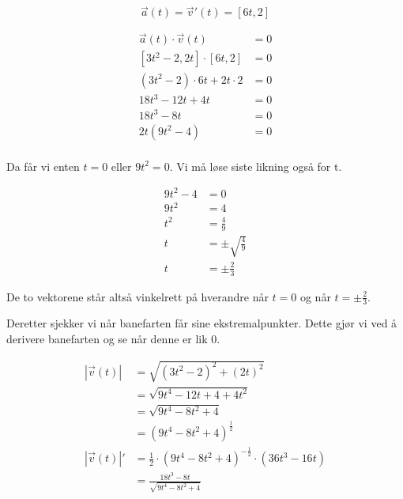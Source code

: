 \begin{easylist}[enumerate]
		$$\vec{a}(t)  = \vec{v}'(t)  = [6t,2] $$
		
		\begin{equation*}
			\begin{aligned}
				\vec{a}(t) \cdot \vec{v}(t) &= 0 \\
				[3t^2 -2,2t] \cdot [6t,2] & = 0 \\
				(3t^2 - 2) \cdot 6t + 2t \cdot 2  & = 0\\
				18t^3 - 12t + 4t & = 0 \\
				18t^3 - 8t & = 0 \\
				2t(9t^2 -4) & = 0 \\
			\end{aligned}
		\end{equation*}
		
		Da får vi enten $t = 0$ eller $9t^2 = 0$. Vi må løse siste likning også for t.
		
		\begin{equation*}
			\begin{aligned}
				9t^2 -4 & = 0 \\
				9t^2 & = 4 \\
				t^2 & = \frac{4}{9}\\
				t &= \pm \sqrt{\frac{4}{9}} \\
				t &= \pm \frac{2}{3}
			\end{aligned}
		\end{equation*}
		
		De to vektorene står altså vinkelrett på hverandre når $t = 0$ og når $t = \pm \frac{2}{3}$.
		
		Deretter sjekker vi når banefarten får sine ekstremalpunkter. Dette gjør vi ved å derivere banefarten og se når denne er lik 0.
		
		\begin{equation*}
			\begin{aligned}
				|\vec{v}(t)| & = \sqrt{(3t^2 - 2)^2 + (2t)^2} \\
								 & = \sqrt{9t^4 - 12t + 4 +4t^2} \\
								 & = \sqrt{9t^4 - 8t^2 + 4}\\
								 & = (9t^4 - 8t^2 + 4)^{\frac{1}{2}} \\
				|\vec{v}(t)| ' &= \frac{1}{2} \cdot (9t^4 - 8t^2 + 4)^{-\frac{1}{2}} \cdot (36t^3 -16t) \\
								& = \frac{18t^3 - 8t}{\sqrt{9t^4 - 8t^2 + 4}} \\
			\end{aligned}
		\end{equation*}
		

\end{easylist}
